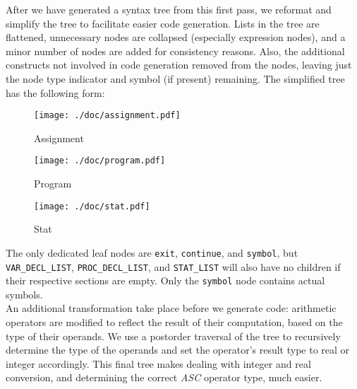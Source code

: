 \documentclass{report}
\begin{document}
After we have generated a syntax tree from this first pass, we reformat and simplify the tree to facilitate easier code generation. Lists in the tree are flattened, unnecessary nodes are collapsed (especially expression nodes), and a minor number of nodes are added for consistency reasons. Also, the additional constructs not involved in code generation removed from the nodes, leaving just the node type indicator and symbol (if present) remaining. The simplified tree has the following form:\\

\begin{figure}[ht]
\caption{Assignment}
\centering
\texttt{[image: ./doc/assignment.pdf]}
\end{figure}

\begin{figure}[ht]
\caption{Program}
\centering
\texttt{[image: ./doc/program.pdf]}
\end{figure}

\begin{figure}[ht]
\caption{Stat}
\centering
\texttt{[image: ./doc/stat.pdf]}\\
\end{figure}

The only dedicated leaf nodes are \texttt{exit}, \texttt{continue}, and \texttt{symbol}, but \texttt{VAR\_DECL\_LIST}, \texttt{PROC\_DECL\_LIST},  and \texttt{STAT\_LIST} will also have no children if their respective sections are empty. Only the \texttt{symbol} node contains actual symbols.\\

An additional transformation take place before we generate code: arithmetic operators are modified to reflect the result of their computation, based on the type of their operands. We use a postorder traversal of the tree to recursively determine the type of the operands and set the operator's result type to real or integer accordingly. This final tree makes dealing with integer and real conversion, and determining the correct \emph{ASC} operator type, much easier.
\end{document}
